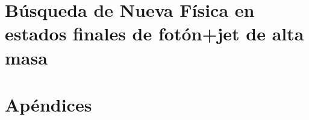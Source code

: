 \documentclass[a4paper,11pt,oneside,spanish]{memoir}
\begin{document}
\FloatBarrier
\part{B\'usqueda de Nueva F\'isica en estados finales de fot\'on+jet de alta masa}
\label{part:search}








\FloatBarrier



















\appendix
\part*{Apéndices}




\backmatter














\clearpage



% 
%
%
% 
% 
%
% 







\end{document}
